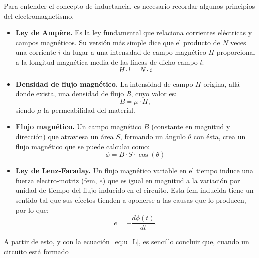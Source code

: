 	\begin{remark}
          Para entender el concepto de inductancia, es necesario
          recordar algunos principios del electromagnetismo.
          \begin{itemize}
          \item \textbf{Ley de Ampère.} Es la ley fundamental que
            relaciona corrientes eléctricas y campos magnéticos. Su
            versión más simple dice que el producto de $N$ veces una
            corriente $i$ da lugar a una intensidad de campo magnético
            $H$ proporcional a la longitud magnética media de las
            líneas de dicho campo $l$:
            \begin{equation*}
              \label{eq:ampere_mod}
              H\cdot l=N\cdot i
            \end{equation*}
          \item \textbf{Densidad de flujo magnético.} La intensidad de
            campo $H$ origina, allá donde exista, una densidad de
            flujo $B$, cuyo valor es:
            \begin{equation*}\label{eq:B}
              B=\mu\cdot H,
            \end{equation*}
            siendo $\mu$ la permeabilidad del material.
          \item \textbf{Flujo magnético.} Un campo magnético $B$
            (constante en magnitud y dirección) que atraviesa un área
            $S$, formando un ángulo $\theta$ con ésta, crea un flujo
            magnético que se puede calcular como:
            \begin{equation*}\label{eq:flujo1}
              \phi=B\cdot S\cdot \cos (\theta)
            \end{equation*}
          \item \textbf{Ley de Lenz-Faraday.} Un flujo magnético
            variable en el tiempo induce una fuerza electro-motriz
            (fem, $e$) que es igual en magnitud a la variación por
            unidad de tiempo del flujo inducido en el circuito. Esta
            fem inducida tiene un sentido tal que sus efectos tienden
            a oponerse a las causas que lo producen, por lo que:
            \begin{equation*}\label{eq:lenz-faraday}
              e=-\dfrac{d\phi(t)}{dt}.
            \end{equation*}
          \end{itemize}
          A partir de esto, y con la ecuación~\eqref{eq:u_L}, es
          sencillo concluir que, cuando un circuito está formado

\end{remark}
